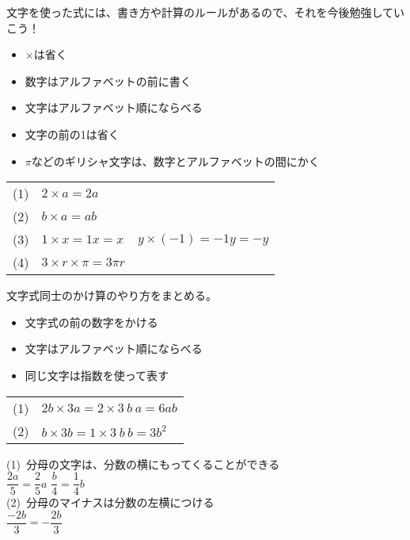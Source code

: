 \documentclass[11pt]{article}
\begin{document}
文字を使った式には、書き方や計算のルールがあるので、それを今後勉強していこう！\\

\begin{tcolorbox}[mybox={文字式の書き方のルール}]
\begin{itemize}
\item $\times$は省く
\item 数字はアルファベットの前に書く
\item 文字はアルファベット順にならべる
\item 文字の前の1は省く
\item $\pi$などのギリシャ文字は、数字とアルファベットの間にかく
\end{itemize}
\end{tcolorbox}


\begin{tabular}{llr}
(1) & $2 \times a = 2a$ & \\
(2) & $b \times a = ab$ &\\
(3) & $1 \times x = 1x =x$ & \hspace{2cm} $y \times (-1) = -1y =-y$ \\
(4) & $3 \times r \times \pi = 3\pi r$ &\\
\end{tabular}


\begin{tcolorbox}[mybox={文字式の積}]
文字式同士のかけ算のやり方をまとめる。
\begin{itemize}
\item 文字式の前の数字をかける
\item 文字はアルファベット順にならべる
\item 同じ文字は指数を使って表す
\end{itemize}
\end{tcolorbox}


\begin{tabular}{ll}
(1) & $2b \times 3a = 2 \times 3 \ b \ a = 6 ab$\\
(2) & $b \times 3b = 1 \times 3\ b \  b = 3b^2$\\
\end{tabular}

\begin{tcolorbox}[mybox={文字式と分数のルール}]
(1)\ 分母の文字は、分数の横にもってくることができる\\

$\dfrac{2a}{5} = \dfrac{2}{5} a$ \hspace{1cm} $\dfrac{b}{4} = \dfrac{1}{4} b$\\

(2)\ 分母のマイナスは分数の左横につける\\

$\dfrac{-2b}{3} = - \dfrac{2b}{3}$
\end{tcolorbox}
\end{document}
